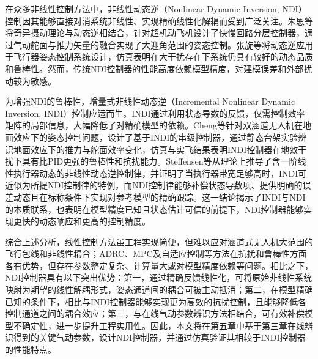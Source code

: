 在众多非线性控制方法中，非线性动态逆（Nonlinear Dynamic Inversion, NDI）控制因其能够直接对消系统非线性、实现精确线性化解耦而受到广泛关注。朱恩等将奇异摄动理论与动态逆相结合，针对超机动飞机设计了快慢回路分层控制器，通过气动舵面与推力矢量的融合实现了大迎角范围的姿态控制\cite{zhu1997NDI}。张旋等将动态逆应用于飞行器姿态控制系统设计，仿真表明在大干扰存在下系统仍具有较好的动态品质和鲁棒性\cite{zhang2015NDI}。然而，传统NDI控制器的性能高度依赖模型精度，对建模误差和外部扰动较为敏感。

为增强NDI的鲁棒性，增量式非线性动态逆（Incremental Nonlinear Dynamic Inversion, INDI）控制应运而生。INDI通过利用状态导数的反馈，仅需控制效率矩阵的局部信息，大幅降低了对精确模型的依赖。Cheng等针对双涵道无人机在地面效应下的姿态控制问题，设计了基于INDI的串级控制器，通过静态台架实验辨识地面效应下的推力与舵面效率变化，仿真与实飞结果表明INDI控制器在地效干扰下具有比PID更强的鲁棒性和抗扰能力\cite{Cheng2024INDI}。Steffensen等从理论上推导了含一阶线性执行器动态的非线性动态逆控制律，并证明了当执行器带宽足够高时，INDI可近似为所提NDI控制律的特例，而NDI控制律能够补偿状态导数项、提供明确的误差动态且在标称条件下实现对参考模型的精确跟踪\cite{SteffensenINDI}。这一结论揭示了INDI与NDI的本质联系，也表明在模型精度已知且状态估计可信的前提下，NDI控制器能够实现更快的动态响应和更高的控制精度。

综合上述分析，线性控制方法虽工程实现简便，但难以应对涵道式无人机大范围的飞行包线和非线性耦合；ADRC、MPC及自适应控制等方法在抗扰和鲁棒性方面各有优势，但存在参数整定复杂、计算量大或对模型精度依赖等问题。相比之下，NDI控制器具有以下突出优势：第一，通过精确反馈线性化，可将原始非线性系统映射为期望的线性解耦形式，姿态通道间的耦合可被主动抵消；第二，在模型精确已知的条件下，相比与INDI控制器能够实现更为高效的抗扰控制，且能够降低各控制通道之间的耦合效应；第三，与在线气动参数辨识方法相结合，可有效补偿模型不确定性，进一步提升工程实用性。因此，本文将在第五章中基于第三章在线辨识得到的关键气动参数，设计NDI控制器，并通过仿真验证其相较于INDI控制器的性能特点。


